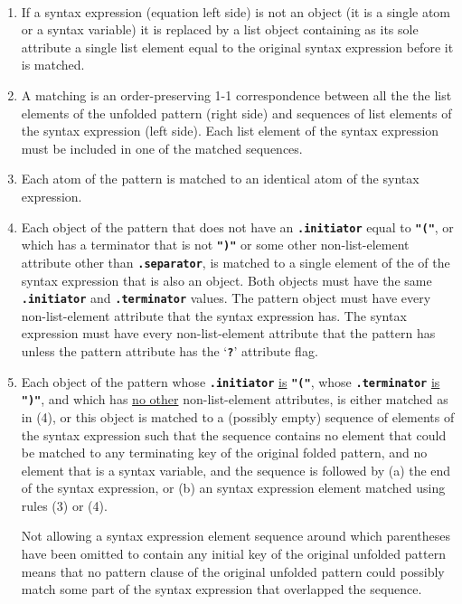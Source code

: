\documentclass[12pt]{article}
\newcommand{\TT}[1]{{\tt \bfseries #1}}
\newcommand{\key}[1]{{\rm \bfseries #1}}
\newenvironment{indpar}[1][0.3in]%
	{\begin{list}{}%
		     {\setlength{\itemsep}{0in}%
		      \setlength{\topsep}{0in}%
		      \setlength{\parsep}{1ex}%
		      \setlength{\labelwidth}{#1}%
		      \setlength{\leftmargin}{#1}%
		      \addtolength{\leftmargin}{\labelsep}}%
	 \item}%
	{\end{list}}
\begin{document}
\begin{indpar}
\begin{list}{}{}
\item[\key{Pattern Matching Rules}%
	   \index{matching rules}%
	   \label{PATTERN-MATCHING-RULES}:]~

\begin{enumerate}

\item If a syntax expression (equation left side) is not an object
(it is a single atom or a syntax variable)
it is replaced by a list object containing as its
sole attribute a single list element equal to the original syntax expression
before it is matched.

\item A matching is an order-preserving
1-1 correspondence between all the the list elements of
the unfolded pattern (right side)
and sequences of list elements of the syntax expression (left side).
Each list element of the syntax expression must be included in
one of the matched sequences.

\item Each atom of the pattern is matched to an identical atom of the
syntax expression.

\item Each object of the pattern that does not have
an \TT{.initiator} equal to \TT{"("},
or which has a terminator that is not \TT{")"} or
some other non-list-element attribute other than \TT{.separator},
is match\-ed to a single element of the of the syntax expression
that is also an object.  Both objects must have the same
\TT{.initiator} and \TT{.terminator} values.  The pattern object
must have every
non-list-element attribute that the syntax expression has.
The syntax expression must have every non-list-element attribute that
the pattern has unless the pattern attribute has the `\TT{?}' attribute
flag.

\item Each object of the pattern whose \TT{.initiator} \underline{is}
\TT{"("}, whose \TT{.ter\-min\-a\-tor} \underline{is} \TT{")"},
and which has \underline{no other} non-list-element attributes,
is either matched as in (4), or this object
is matched to a (possibly empty)
sequence of elements of the syntax expression such that
the sequence contains no element that could be matched to any
terminating key of the original folded pattern, and no element
that is a syntax variable, and the sequence is
followed by (a) the end of the syntax expression, or (b)
an syntax expression element matched using rules (3) or (4).

\medskip

Not allowing a syntax expression element
sequence around which parentheses have been omitted
to contain any initial key of the original unfolded pattern means
that no pattern clause of the original unfolded pattern could
possibly match some part of the syntax expression that overlapped
the sequence.

\end{enumerate}

\end{list}
\end{indpar}
\end{document}
